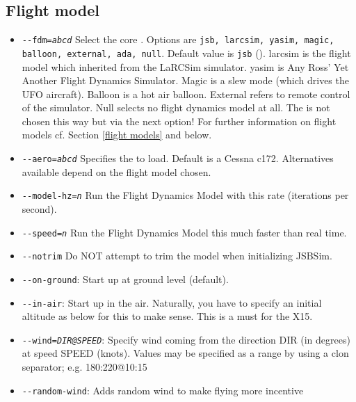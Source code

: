 \subsection{Flight model}\label{flight dynamics model}
\begin{itemize}
\item{\texttt{-$ $-fdm={\it abcd}}} Select the core .
Options are \texttt{jsb, larcsim, yasim, magic, balloon, external, ada, null}. Default value is
\texttt{jsb} (\JSBSim). larcsim is the flight model which \FlightGear{} inherited from the LaRCSim simulator. yasim is Any Ross' Yet Another Flight Dynamics Simulator. Magic is a slew mode (which drives the UFO aircraft). Balloon is a hot air balloon. External refers to remote control of the simulator. Null selects no flight dynamics model at all. The  is not chosen this way but via the next option! For further information on flight models cf. Section \ref{flight models} and below.
\item{\texttt{-$ $-aero={\it abcd}}} Specifies the  to load. Default is a Cessna c172. Alternatives available depend on the flight model chosen. 
\item{\texttt{-$ $-model-hz={\it n}}} Run the Flight Dynamics Model with this rate
(iterations per second).
\item{\texttt{-$ $-speed={\it n}}} Run the Flight Dynamics Model this much faster than real
time.
\item{\texttt{-$ $-notrim}} Do NOT attempt to trim the model when initializing JSBSim.
\item{\texttt{-$ $-on-ground}}: Start up at ground level (default).
\item{\texttt{-$ $-in-air}}: Start up in the air. Naturally, you have to specify an
initial altitude as below for this to make sense. This is a must for the X15.
\item{\texttt{-$ $-wind={\it DIR@SPEED}}}: Specify wind coming from the direction DIR (in
degrees) at speed SPEED (knots). Values may be specified as a range by using a clon separator; e.g. 180:220@10:15
\item{\texttt{-$ $-random-wind}}: Adds random wind to make flying more incentive
\end{itemize}

